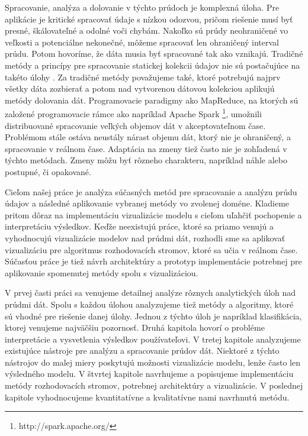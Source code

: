 \par
Spracovanie, analýza a dolovanie v týchto prúdoch je komplexná úloha. Pre aplikácie je kritické spracovať údaje s nízkou odozvou, pričom riešenie musí byť presné, škálovateľné a odolné voči chybám. Nakoľko sú prúdy neohraničené vo veľkosti a potenciálne nekonečné, môžeme spracovať len ohraničený interval prúdu. Potom hovoríme, že dáta musia byť spracované tak ako vznikajú. Tradičné metódy a princípy pre spracovanie statickej kolekcii údajov nie sú postačujúce na takéto úlohy \citep{krempl2014open, han2011data}. Za tradičné metódy považujeme také, ktoré potrebujú najprv všetky dáta zozbierať a potom nad vytvorenou dátovou kolekciou aplikujú metódy dolovania dát. Programovacie paradigmy ako MapReduce, na ktorých sú založené programovacie rámce ako napríklad Apache Spark \footnote{http://spark.apache.org/}, umožnili distribuované spracovanie veľkých objemov dát v akceptovateľnom čase. Problémom stále ostáva neustály nárast objemu dát, ktorý nie je ohraničený, a spracovanie v reálnom čase. Adaptácia na zmeny tiež často nie je zohľadená v týchto metódach. Zmeny môžu byť rôzneho charakteru, napríklad náhle alebo postupné, či opakované.
\par
Cieľom našej práce je analýza súčasných metód pre spracovanie a analýzu prúdu údajov a následné aplikovanie vybranej metódy vo zvolenej doméne. Kladieme pritom dôraz na implementáciu vizualizácie modelu s cieľom uľahčiť pochopenie a interpretáciu výsledkov. Keďže neexistujú práce, ktoré sa priamo venujú a vyhodnocujú vizualizácie modelov nad prúdmi dát, rozhodli sme sa aplikovať vizualizáciu pre algoritmus rozhodovacích stromov, ktoré sa učia v reálnom čase. Súčasťou práce je tiež návrh architektúry a prototyp implementácie potrebnej pre aplikovanie spomenutej metódy spolu s vizualizáciou.
\par
V prvej časti práci sa venujeme detailnej analýze rôznych analytických úloh nad prúdmi dát. Spolu s každou úlohou analyzujeme tiež metódy a algoritmy, ktoré sú vhodné pre riešenie danej úlohy. Jednou z týchto úloh je napríklad klasifikácia, ktorej venujeme	najväčšiu pozornosť. Druhá kapitola hovorí o probléme interpretácie a vysvetlenia výsledkov používateľovi. V tretej kapitole analyzujeme existujúce nástroje pre analýzu a spracovanie prúdov dát. Niektoré z týchto nástrojov do malej miery poskytujú možnosti vizualizácie modelu, lenže často len výsledného modelu. V štvrtej kapitole navrhujeme a popisujeme implementáciu metódy rozhodovacích stromov, potrebnej architektúry a vizualizácie. V poslednej kapitole vyhodnocujeme kvantitatívne a kvalitatívne nami navrhnutú metódu.
